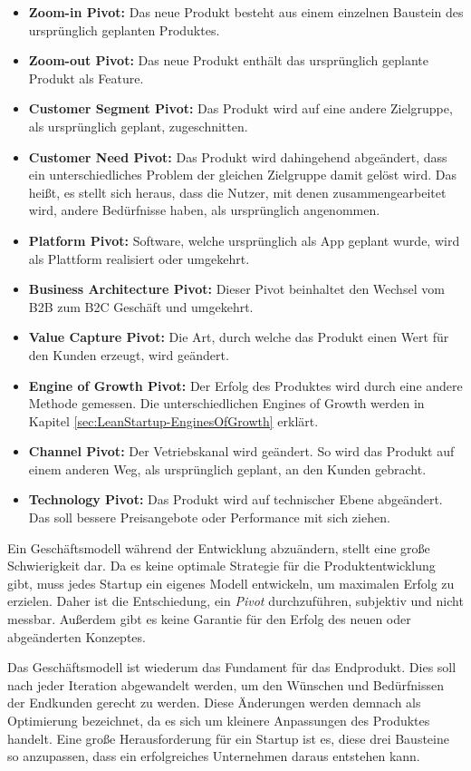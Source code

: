 \begin{itemize}
	\item \textbf{Zoom-in Pivot:} Das neue Produkt besteht aus einem einzelnen Baustein des ursprünglich geplanten Produktes.
	\item \textbf{Zoom-out Pivot:} Das neue Produkt enthält das ursprünglich geplante Produkt als Feature.
	\item \textbf{Customer Segment Pivot:} Das Produkt wird auf eine andere Zielgruppe, als ursprünglich geplant, zugeschnitten.
	\item \textbf{Customer Need Pivot:} Das Produkt wird dahingehend abgeändert, dass ein unterschiedliches Problem der gleichen Zielgruppe damit gelöst wird. Das heißt, es stellt sich heraus, dass die Nutzer, mit denen zusammengearbeitet wird, andere Bedürfnisse haben, als ursprünglich angenommen.
	\item \textbf{Platform Pivot:} Software, welche ursprünglich als App geplant wurde, wird als Plattform realisiert oder umgekehrt.
	\item \textbf{Business Architecture Pivot:} Dieser Pivot beinhaltet den Wechsel vom B2B zum B2C Geschäft und umgekehrt.
	\item \textbf{Value Capture Pivot:} Die Art, durch welche das Produkt einen Wert für den Kunden erzeugt, wird geändert. 
	\item \textbf{Engine of Growth Pivot:} Der Erfolg des Produktes wird durch eine andere Methode gemessen. Die unterschiedlichen Engines of Growth werden in Kapitel \ref{sec:LeanStartup-EnginesOfGrowth} erklärt.
	\item \textbf{Channel Pivot:} Der Vetriebskanal wird geändert. So wird das Produkt auf einem anderen Weg, als ursprünglich geplant, an den Kunden gebracht.
	\item \textbf{Technology Pivot:} Das Produkt wird auf technischer Ebene abgeändert. Das soll bessere Preisangebote oder Performance mit sich ziehen.
\end{itemize}
Ein Geschäftsmodell während der Entwicklung abzuändern, stellt eine große Schwierigkeit dar. Da es keine optimale Strategie für die Produktentwicklung gibt, muss jedes Startup ein eigenes Modell entwickeln, um maximalen Erfolg zu erzielen. Daher ist die Entschiedung, ein \textit{Pivot} durchzuführen, subjektiv und nicht messbar. Außerdem gibt es keine Garantie für den Erfolg des neuen oder abgeänderten Konzeptes. 

Das Geschäftsmodell ist wiederum das Fundament für das Endprodukt. Dies soll nach jeder Iteration abgewandelt werden, um den Wünschen und Bedürfnissen der Endkunden gerecht zu werden. Diese Änderungen werden demnach als Optimierung bezeichnet, da es sich um kleinere Anpassungen des Produktes handelt. Eine große Herausforderung für ein Startup ist es, diese drei Bausteine so anzupassen, dass ein erfolgreiches Unternehmen daraus entstehen kann.

